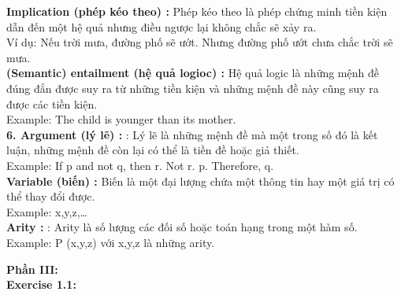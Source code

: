 \documentclass[a4paper]{article}
\begin{document}
\textbf{{\large\hspace{1 cm} Implication (phép kéo theo) : }}{\large Phép kéo theo là phép chứng minh tiền kiện dẫn đến một hệ quả nhưng điều ngược lại không chắc sẽ xảy ra.\\
	
	\hspace{1 cm} Ví dụ: Nếu trời mưa, đường phố sẽ ướt. Nhưng đường phố ướt chưa chắc trời sẽ mưa.}\\

\textbf{{\large\hspace{1 cm} (Semantic) entailment (hệ quả logioc) : }}
{\large Hệ quả logic là những mệnh đề đúng đắn được suy ra từ những tiền kiện và những mệnh đề này cũng suy ra được các tiền kiện.\\
	
	\hspace{1 cm} Example: The child is younger than its mother.}\\

\textbf{{\large\hspace{0.5 cm} 6. Argument (lý lẽ) :  }}
{\large : Lý lẽ là những mệnh đề mà một trong số đó là kết luận, những mệnh đề còn lại có thể là tiền đề hoặc giả thiết.\\
	
	\hspace{1 cm} Example: If p and not q, then r. Not r. p. Therefore, q.}\\

\textbf{{\large\hspace{1 cm} Variable (biến) : }}
{\large Biến là một đại lượng chứa một thông tin hay một giá trị có thể thay đổi được.\\
	
	\hspace{1 cm} Example: x,y,z,…} \\

\textbf{{\large\hspace{1 cm} Arity :  }}
{\large : Arity là số lượng các đối số hoặc toán hạng trong một hàm số.\\
	
	\hspace{1 cm} Example: P (x,y,z) với x,y,z là những arity.}\\

\newpage

\textbf{{\Large Phần III: }}
\\

\textbf{\large\hspace{0.5cm} Exercise 1.1:}
\end{document}
